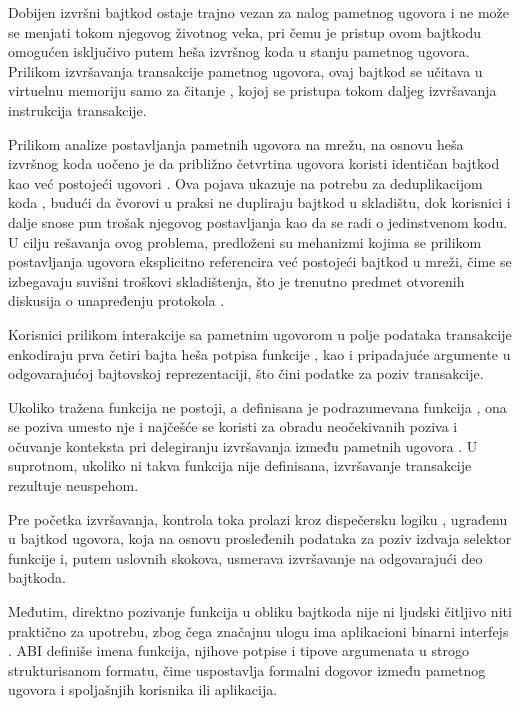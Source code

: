 Dobijen izvršni bajtkod ostaje trajno vezan za nalog pametnog ugovora i ne može se menjati tokom njegovog životnog veka, pri čemu je pristup ovom bajtkodu omogućen isključivo putem heša izvršnog koda u stanju pametnog ugovora. Prilikom izvršavanja transakcije pametnog ugovora, ovaj bajtkod se učitava u virtuelnu memoriju samo za čitanje , kojoj se pristupa tokom daljeg izvršavanja instrukcija transakcije.

Prilikom analize postavljanja pametnih ugovora na mrežu, na osnovu heša izvršnog koda uočeno je da približno četvrtina ugovora koristi identičan bajtkod kao već postojeći ugovori \cite{khan2022code}. Ova pojava ukazuje na potrebu za deduplikacijom koda , budući da čvorovi u praksi ne dupliraju bajtkod u skladištu, dok korisnici i dalje snose pun trošak njegovog postavljanja kao da se radi o jedinstvenom kodu. U cilju rešavanja ovog problema, predloženi su mehanizmi kojima se prilikom postavljanja ugovora eksplicitno referencira već postojeći bajtkod u mreži, čime se izbegavaju suvišni troškovi skladištenja, što je trenutno predmet otvorenih diskusija o unapređenju protokola \cite{DEDUPLICATIONeip8058}.

Korisnici prilikom interakcije sa pametnim ugovorom u polje podataka transakcije enkodiraju prva četiri bajta heša potpisa funkcije , kao i pripadajuće argumente u odgovarajućoj bajtovskoj reprezentaciji, što čini podatke za poziv  transakcije.

Ukoliko tražena funkcija ne postoji, a definisana je podrazumevana funkcija , ona se poziva umesto nje i najčešće se koristi za obradu neočekivanih poziva i očuvanje konteksta pri delegiranju izvršavanja između pametnih ugovora \cite{DELEGATEeip7}. U suprotnom, ukoliko ni takva funkcija nije definisana, izvršavanje transakcije rezultuje neuspehom.

Pre početka izvršavanja, kontrola toka prolazi kroz dispečersku logiku , ugrađenu u bajtkod ugovora, koja na osnovu prosleđenih podataka za poziv izdvaja selektor funkcije i, putem uslovnih skokova, usmerava izvršavanje na odgovarajući deo bajtkoda.

Međutim, direktno pozivanje funkcija u obliku bajtkoda nije ni ljudski čitljivo niti praktično za upotrebu, zbog čega značajnu ulogu ima aplikacioni binarni interfejs . ABI definiše imena funkcija, njihove potpise i tipove argumenata u strogo strukturisanom formatu, čime uspostavlja formalni dogovor između pametnog ugovora i spoljašnjih korisnika ili aplikacija. 

